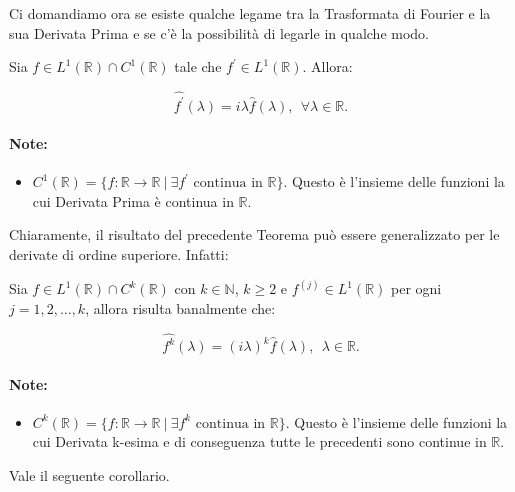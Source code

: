 Ci domandiamo ora se esiste qualche legame tra la Trasformata di Fourier e la
sua Derivata Prima e se c'è la possibilità di legarle in qualche modo.

\begin{theorem}
    Sia $f \in L^1(\mathbb{R}) \cap C^1(\mathbb{R})$ tale che $f^{\prime} \in
        L^1(\mathbb{R})$. Allora:

    $$
        \widehat{f^{\prime}}(\lambda) = i \lambda \hat{f}(\lambda), \ \ \forall
        \lambda \in \mathbb{R}.
    $$
\end{theorem}

\paragraph{Note:}
\begin{itemize}
    \item $C^1(\mathbb{R}) = \{ f: \mathbb{R} \rightarrow \mathbb{R} \ | \
              \exists f^{\prime} \text{ continua in } \mathbb{R} \}$. Questo è
          l'insieme delle funzioni la cui Derivata Prima è continua in
          $\mathbb{R}$.
\end{itemize}

Chiaramente, il risultato del precedente Teorema può essere generalizzato per le
derivate di ordine superiore. Infatti:

\begin{theorem}
    Sia $f \in L^1(\mathbb{R}) \cap C^k(\mathbb{R})$ con $k \in \mathbb{N}$, $k
        \geq 2$ e $f^{\left(j\right)} \in L^1(\mathbb{R})$ per ogni $j = 1, 2,
        \ldots, k$, allora risulta banalmente che:

    $$
        \widehat{f^k}(\lambda) = (i \lambda)^k \hat{f}(\lambda), \ \ \lambda \in
        \mathbb{R}.
    $$
\end{theorem}

\paragraph{Note:}
\begin{itemize}
    \item $C^k(\mathbb{R}) = \{ f: \mathbb{R} \rightarrow \mathbb{R} \ | \
              \exists f^{k} \text{ continua in } \mathbb{R} \}$. Questo è
          l'insieme delle funzioni la cui Derivata k-esima e di conseguenza tutte le precedenti sono continue in
          $\mathbb{R}$.
\end{itemize}

Vale il seguente corollario.

